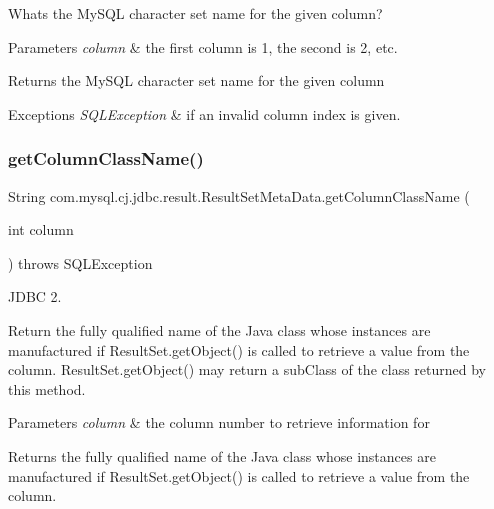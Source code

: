 What\textquotesingle{}s the My\+S\+QL character set name for the given column?


\begin{DoxyParams}{Parameters}
{\em column} & the first column is 1, the second is 2, etc.\\
\hline
\end{DoxyParams}
\begin{DoxyReturn}{Returns}
the My\+S\+QL character set name for the given column
\end{DoxyReturn}

\begin{DoxyExceptions}{Exceptions}
{\em S\+Q\+L\+Exception} & if an invalid column index is given. \\
\hline
\end{DoxyExceptions}
\mbox{\label{classcom_1_1mysql_1_1cj_1_1jdbc_1_1result_1_1_result_set_meta_data_a6aeea7ec7447ad647fbf8c94db5dbe76}} 
\subsubsection{\texorpdfstring{get\+Column\+Class\+Name()}{getColumnClassName()}}
{\footnotesize\ttfamily String com.\+mysql.\+cj.\+jdbc.\+result.\+Result\+Set\+Meta\+Data.\+get\+Column\+Class\+Name (\begin{DoxyParamCaption}\item[{int}]{column }\end{DoxyParamCaption}) throws S\+Q\+L\+Exception}

J\+D\+BC 2.

Return the fully qualified name of the Java class whose instances are manufactured if Result\+Set.\+get\+Object() is called to retrieve a value from the column. Result\+Set.\+get\+Object() may return a sub\+Class of the class returned by this method. 


\begin{DoxyParams}{Parameters}
{\em column} & the column number to retrieve information for\\
\hline
\end{DoxyParams}
\begin{DoxyReturn}{Returns}
the fully qualified name of the Java class whose instances are manufactured if Result\+Set.\+get\+Object() is called to retrieve a value from the column.
\end{DoxyReturn}

